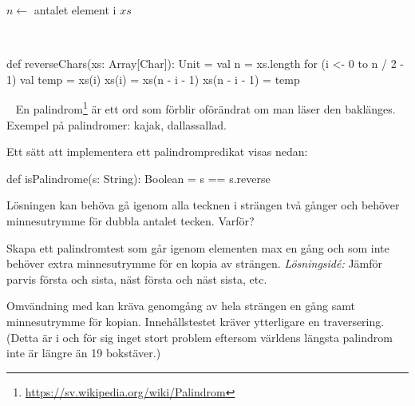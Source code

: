 \begin{algorithm}[H]

 $n \leftarrow$ antalet element i $xs$\\
\end{algorithm}

\SOLUTION

\TaskSolved \what~
\begin{Code}
def reverseChars(xs: Array[Char]): Unit = {
  val n = xs.length
  for (i <- 0 to n / 2 - 1) {
    val temp = xs(i)
    xs(i) = xs(n - i - 1)
    xs(n - i - 1) = temp
  }
}
\end{Code}

\QUESTEND







\QUESTBEGIN

\Task  \what~ En palindrom\footnote{\url{https://sv.wikipedia.org/wiki/Palindrom}} är ett ord som förblir oförändrat om man läser den baklänges. Exempel på palindromer: kajak, dallassallad.

Ett sätt att implementera ett palindrompredikat visas nedan:
\begin{Code}
def isPalindrome(s: String): Boolean = s == s.reverse
\end{Code}

\Subtask Lösningen kan behöva gå igenom alla tecknen i strängen två gånger och behöver minnesutrymme för dubbla antalet tecken. Varför?

\Subtask Skapa ett palindromtest som går igenom elementen max en gång och som inte behöver extra minnesutrymme för en kopia av strängen. \emph{Lösningsidé:} Jämför parvis första och sista, näst första och näst sista, etc.

\SOLUTION

\TaskSolved \what

\SubtaskSolved Omvändning med  kan kräva genomgång av hela strängen en gång samt minnesutrymme för kopian. Innehållstestet kräver ytterligare en traversering. (Detta är i och för sig inget stort problem eftersom världens längsta palindrom inte är längre än 19 bokstäver.)

